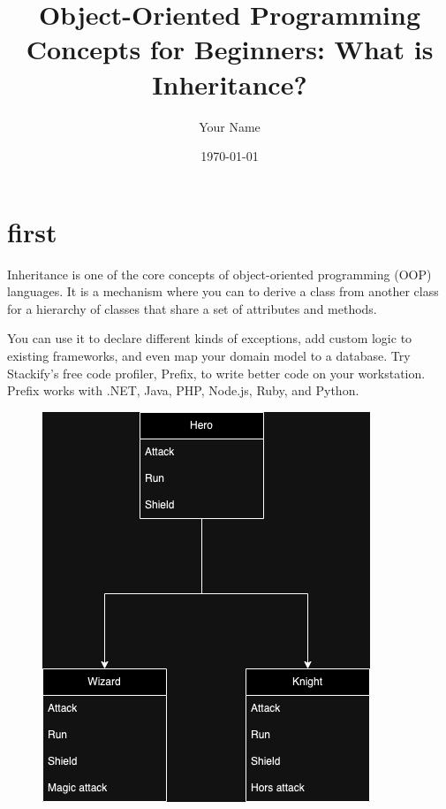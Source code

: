 \documentclass{article}
\title{Object-Oriented Programming Concepts for Beginners: What is Inheritance?}
\author{Your Name}
\date{\today}
\begin{document}
    \section{first}

    Inheritance is one of the core concepts of object-oriented programming (OOP) languages. It is a mechanism where you can to derive a class from another class for a hierarchy of classes that share a set of attributes and methods.

    You can use it to declare different kinds of exceptions, add custom logic to existing frameworks, and even map your domain model to a database.
    Try Stackify’s free code profiler, Prefix, to write better code on your workstation. Prefix works with .NET, Java, PHP, Node.js, Ruby, and Python.
    \begin{figure}[h]
        \begin{minipage}[t]{0.48\linewidth}
            \includegraphics[width=\textwidth]{test}
        \end{minipage}
        \hfill
        \begin{minipage}[t]{0.48\linewidth}

\end{minipage}
\end{figure}
\end{document}
